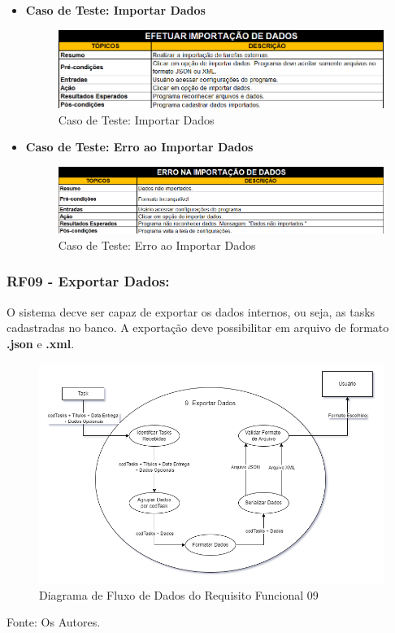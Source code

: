 \documentclass[a4paper,12pt]{article}
\begin{document}
\begin{itemize}
	\item\textbf{Caso de Teste: Importar Dados}
	\begin{figure}
		\centering
		\includegraphics[scale=0.65]{UnitTest/trueCase/importData.png}
		\caption{Caso de Teste: Importar Dados}
	\end{figure}
	\item\textbf{Caso de Teste: Erro ao Importar Dados}
	\begin{figure}
		\centering
		\includegraphics[scale=0.65]{UnitTest/falseCase/importData.png}
		\caption{Caso de Teste: Erro ao Importar Dados}
	\end{figure}
\end{itemize}

\pagebreak

\subsubsection{RF09 - Exportar Dados:}
O sistema decve ser capaz de exportar os dados internos, ou seja, as tasks cadastradas no banco. A exportação deve possibilitar 
em arquivo de formato \textbf{.json} e \textbf{.xml}.
\begin{figure}[H]
	\centering
	\includegraphics[scale=0.45]{DFDs/RF09.drawio.png}
	\caption{Diagrama de Fluxo de Dados do Requisito Funcional 09}
\end{figure}
\noindent Fonte: Os Autores.
\end{document}
